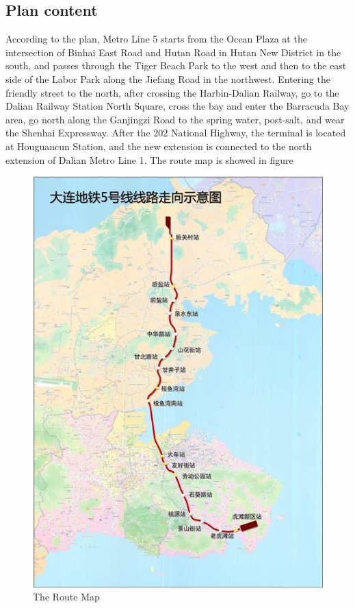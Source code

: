 \documentclass[12pt]{article}
\begin{document}
\subsection{Plan content}
According to the plan, Metro Line 5 starts from the Ocean Plaza at the intersection of Binhai East Road and Hutan Road in Hutan New District in the south, and passes through the Tiger Beach Park to the west and then to the east side of the Labor Park along the Jiefang Road in the northwest. Entering the friendly street to the north, after crossing the Harbin-Dalian Railway, go to the Dalian Railway Station North Square, cross the bay and enter the Barracuda Bay area, go north along the Ganjingzi Road to the spring water, post-salt, and wear the Shenhai Expressway. After the 202 National Highway, the terminal is located at Houguancun Station, and the new extension is connected to the north extension of Dalian Metro Line 1. The route map is showed in figure


\begin{figure}[htbp]
	\centering
	\includegraphics[width=6in]{figures/01.jpg}
	\caption{The Route Map}
\end{figure}
\end{document}
